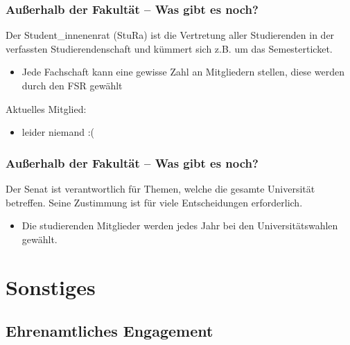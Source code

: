 \documentclass[10pt]{beamer}
\begin{document}
\begin{frame}
	\frametitle{Außerhalb der Fakultät -- Was gibt es noch?}
	
	\begin{block}{\vphantom{X}}
		Der Student\_innenenrat (StuRa) ist die Vertretung aller Studierenden in der verfassten Studierendenschaft und kümmert sich z.B. um das Semesterticket.
	\end{block}

	\begin{itemize}
		\item Jede Fachschaft kann eine gewisse Zahl an Mitgliedern stellen, diese werden durch den FSR gewählt
	\end{itemize}

	\vspace*{1.0cm}

	Aktuelles Mitglied:

	\begin{itemize}
		\item leider niemand :(
	\end{itemize}
\end{frame}

\begin{frame}
	\frametitle{Außerhalb der Fakultät -- Was gibt es noch?}

	\begin{block}{\vphantom{X}}
		Der Senat ist verantwortlich für Themen, welche die gesamte Universität betreffen. Seine Zustimmung ist für viele Entscheidungen erforderlich.
	\end{block}

	\begin{itemize}
		\item Die studierenden Mitglieder werden jedes Jahr bei den Universitätswahlen gewählt.
	\end{itemize}
\end{frame}


\section{Sonstiges}
\frame{\tableofcontents[currentsection]}

\subsection*{Ehrenamtliches Engagement}
\end{document}
